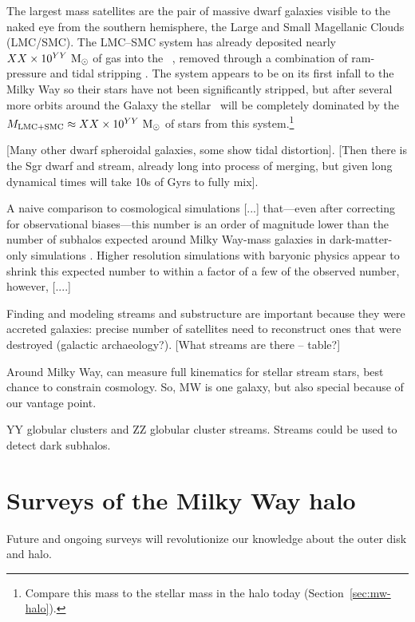 The largest mass satellites are the pair of massive dwarf galaxies visible to the naked eye from the southern hemisphere, the Large and Small Magellanic Clouds (LMC/SMC). The LMC--SMC system has already deposited nearly $XX \times 10^{YY}~\mathrm{M}_\odot$ of gas into the \mwhalo\ \citep{putman-todo}, removed through a combination of ram-pressure and tidal stripping \citep{salem-todo}. The system appears to be on its first infall to the Milky Way \citep{besla10} so their stars have not been significantly stripped, but after several more orbits around the Galaxy the stellar \mwhalo\ will be completely dominated by the $M_{\rm LMC+SMC} \approx XX \times 10^{YY}~\mathrm{M}_\odot$ of stars from this system.\footnote{Compare this mass to the stellar mass in the halo today (Section~\ref{sec:mw-halo}).} 

[Many other dwarf spheroidal galaxies, some show tidal distortion]. [Then there is the Sgr dwarf and stream, already long into process of merging, but given long dynamical times will take 10s of Gyrs to fully mix]. 

A naive comparison to cosmological simulations [...] that---even after correcting for observational biases---this number is an order of magnitude lower than the number of subhalos expected around Milky Way-mass galaxies in dark-matter-only simulations \citep[$\sim$1000;][]{missing-satellites-todo}. Higher resolution simulations with baryonic physics appear to shrink this expected number to within a factor of a few of the observed number, however, [....]

Finding and modeling streams and substructure are important because they were accreted galaxies: precise number of satellites need to reconstruct ones that were destroyed (galactic archaeology?). [What streams are there -- table?]

Around Milky Way, can measure full kinematics for stellar stream stars, best chance to constrain cosmology. So, MW is one galaxy, but also special because of our vantage point.

YY globular clusters and ZZ globular cluster streams. Streams could be used to detect dark subhalos. 

\section{Surveys of the Milky Way halo}\label{sec:surveys}

Future and ongoing surveys will revolutionize our knowledge about the outer disk and halo.

